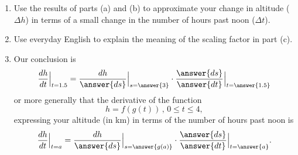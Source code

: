 \documentclass{ximera}
\begin{document}
\begin{question}
\begin{enumerate}
\begin{enumerate}
\item Use everyday Engish to explain the meaning of the derivative.

\item Approximate the change
\[
  \Delta s = s - 3
\]
in your distance from the trailhead (in km) in terms of a small change
\[
     \Delta t = t - 1.5
\]
in the number of hours past noon.
\end{enumerate}

\item Use the results of parts (a) and (b) to approximate your change in altitude ($\Delta h$) in terms of a small change in the number of hours past noon ($\Delta t$).

\item Use everyday English to explain the meaning of the scaling factor in part (c).

\item Our conclusion is 
\[
    \frac{dh}{dt}\Big|_{t=1.5} = \frac{dh}{\answer{ds}}\Big|_{s=\answer{3}}    \cdot \frac{\answer{ds}}{\answer{dt}}\Big|_{t=\answer{1.5}}
\]
or more generally that the derivative of the function
\[
    h = f(g(t)) \, , \, 0\leq t \leq 4,
\]
expressing  your altitude (in km) in terms of the number of hours past noon is
\[
  \frac{dh}{dt}\Big|_{t=a} = \frac{dh}{\answer{ds}}\Big|_{s=\answer{g(a)}}    \cdot \frac{\answer{ds}}{\answer{dt}}\Big|_{t=\answer{a}} .
\]
\end{enumerate}

\end{question}
\end{document}
